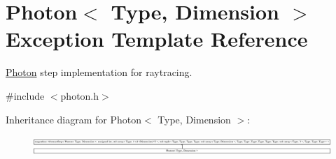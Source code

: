 \hypertarget{exceptionPhoton}{\section{Photon$<$ Type, Dimension $>$ Exception Template Reference}
\label{exceptionPhoton}
}


\hyperlink{exceptionPhoton}{Photon} step implementation for raytracing.  




{\ttfamily \#include $<$photon.\-h$>$}

Inheritance diagram for Photon$<$ Type, Dimension $>$\-:\begin{figure}[H]
\begin{center}
\leavevmode
\includegraphics[height=0.740251cm]{exceptionPhoton}
\end{center}
\end{figure}
